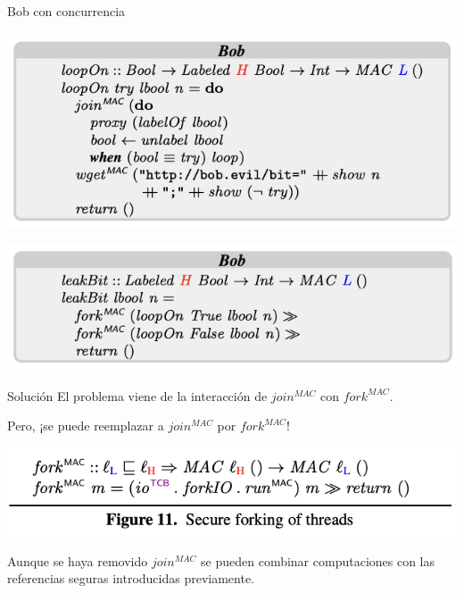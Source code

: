 \documentclass{beamer}
\begin{document}
\begin{frame}{Bob con concurrencia}
    \begin{center}
        \includegraphics[scale=0.7]{codigo_bob4.png}
    \end{center}

    \begin{center}
        \includegraphics[scale=0.7]{codigo_bob5.png}
    \end{center}
\end{frame}

\begin{frame}{Solución}
    El problema viene de la interacción de $join^{MAC}$ con $fork^{MAC}$.

    Pero, ¡se puede reemplazar a $join^{MAC}$ por $fork^{MAC}$!

    \begin{center}
        \includegraphics[scale=0.8]{figure11.png}
    \end{center}

    Aunque se haya removido $join^{MAC}$ se pueden combinar computaciones con las referencias seguras introducidas previamente.
\end{frame}
\end{document}

